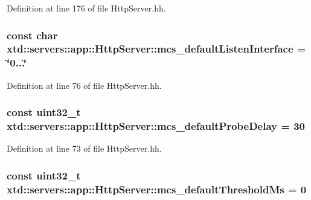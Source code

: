 Definition at line 176 of file Http\-Server.\-hh.

\hypertarget{classxtd_1_1servers_1_1app_1_1HttpServer_a38433b4c2d0bba9f0bae81266b42bac1}{
\subsubsection[{mcs\-\_\-default\-Listen\-Interface}]{\setlength{\rightskip}{0pt plus 5cm}const char xtd\-::servers\-::app\-::\-Http\-Server\-::mcs\-\_\-default\-Listen\-Interface = \char`\"{}0...\char`\"{}\hspace{0.3cm}{\ttfamily [static]}}}\label{classxtd_1_1servers_1_1app_1_1HttpServer_a38433b4c2d0bba9f0bae81266b42bac1}


Definition at line 76 of file Http\-Server.\-hh.

\hypertarget{classxtd_1_1servers_1_1app_1_1HttpServer_a9ca36e61f5c201a51a68b3919e0badb7}{
\subsubsection[{mcs\-\_\-default\-Probe\-Delay}]{\setlength{\rightskip}{0pt plus 5cm}const uint32\-\_\-t xtd\-::servers\-::app\-::\-Http\-Server\-::mcs\-\_\-default\-Probe\-Delay = 30\hspace{0.3cm}{\ttfamily [static]}}}\label{classxtd_1_1servers_1_1app_1_1HttpServer_a9ca36e61f5c201a51a68b3919e0badb7}


Definition at line 73 of file Http\-Server.\-hh.

\hypertarget{classxtd_1_1servers_1_1app_1_1HttpServer_ad21741083478d35b92ba0b1da7499950}{
\subsubsection[{mcs\-\_\-default\-Threshold\-Ms}]{\setlength{\rightskip}{0pt plus 5cm}const uint32\-\_\-t xtd\-::servers\-::app\-::\-Http\-Server\-::mcs\-\_\-default\-Threshold\-Ms = 0\hspace{0.3cm}{\ttfamily [static]}}}\label{classxtd_1_1servers_1_1app_1_1HttpServer_ad21741083478d35b92ba0b1da7499950}


